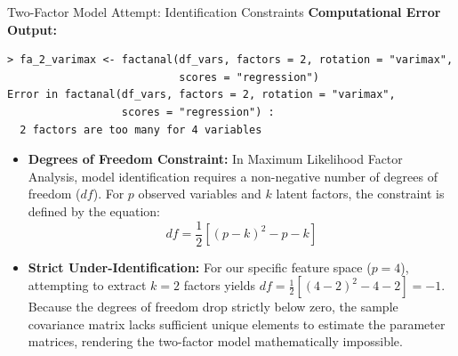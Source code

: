 \documentclass[8pt, aspectratio=169]{beamer}
\begin{document}
\begin{frame}[fragile]{Two-Factor Model Attempt: Identification Constraints}
    \textbf{Computational Error Output:}
    \footnotesize
    \begin{verbatim}
> fa_2_varimax <- factanal(df_vars, factors = 2, rotation = "varimax", 
                           scores = "regression")
Error in factanal(df_vars, factors = 2, rotation = "varimax", 
                  scores = "regression") : 
  2 factors are too many for 4 variables
    \end{verbatim}
    \normalsize

    \vspace{0.4cm}
    \begin{itemize}
        \item \textbf{Degrees of Freedom Constraint:} In Maximum Likelihood Factor Analysis, model identification requires a non-negative number of degrees of freedom ($df$). For $p$ observed variables and $k$ latent factors, the constraint is defined by the equation:
        $$ df = \frac{1}{2}[(p - k)^2 - p - k] $$
        
        \item \textbf{Strict Under-Identification:} For our specific feature space ($p = 4$), attempting to extract $k = 2$ factors yields $df = \frac{1}{2}[(4 - 2)^2 - 4 - 2] = -1$. Because the degrees of freedom drop strictly below zero, the sample covariance matrix lacks sufficient unique elements to estimate the parameter matrices, rendering the two-factor model mathematically impossible.
    \end{itemize}
\end{frame}
\end{document}
